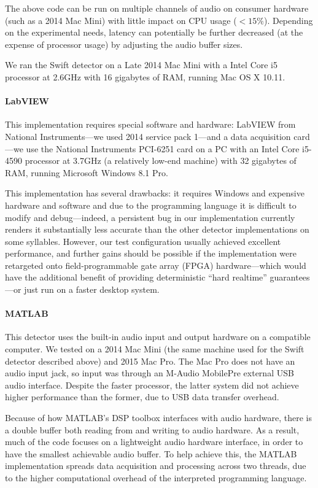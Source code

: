 \documentclass[10pt,letterpaper]{article}
\renewcommand{\subsubsection}[1]{\paragraph{#1}}
\begin{document}
The above code can be run on multiple channels of audio on consumer
hardware (such as a 2014 Mac Mini) with little impact on CPU usage
($<15\%$). Depending on the experimental needs, latency can potentially
be further decreased (at the expense of processor usage) by adjusting the audio
buffer sizes.

We ran the Swift detector on a Late 2014 Mac Mini with a Intel Core i5
processor at 2.6GHz  with 16 gigabytes of RAM, running Mac OS X 10.11.

\subsubsection{LabVIEW}

This implementation requires special software and hardware: LabVIEW
from National Instruments---we used 2014 service pack 1---and a data acquisition card---we use the
National Instruments PCI-6251 card on a PC with an Intel Core i5-4590
processor at 3.7GHz (a relatively low-end machine) with 32 gigabytes
of RAM, running Microsoft Windows 8.1 Pro.

This implementation has several drawbacks: it requires Windows and
expensive hardware and software and due to the programming language it
is difficult to modify and debug---indeed, a persistent bug in our
implementation currently renders it substantially less accurate than
the other detector implementations on some syllables. However, our
test configuration usually achieved excellent performance, and further
gains should be possible if the implementation were retargeted onto
field-programmable gate array (FPGA) hardware---which would have the additional benefit of providing
deterministic ``hard realtime'' guarantees---or just run on a faster
desktop system.

\subsubsection{MATLAB}

This detector uses the built-in audio input and output hardware on a
compatible computer.  We tested on a 2014 Mac Mini (the same machine used
for the Swift detector described above) and 2015 Mac Pro.
The Mac Pro does not have an audio input jack, so input was through an
M-Audio MobilePre external USB audio interface.  Despite the faster
processor, the latter system did not achieve higher performance than
the former, due to USB data transfer overhead.

Because of how MATLAB's DSP toolbox interfaces with audio hardware,
there is a double buffer both reading from and writing to audio
hardware. As a result, much of the code focuses on a lightweight audio
hardware interface, in order to have the smallest achievable audio
buffer. To help achieve this, the MATLAB implementation spreads data
acquisition and processing across two threads, due to the higher
computational overhead of the interpreted programming language.
\end{document}
